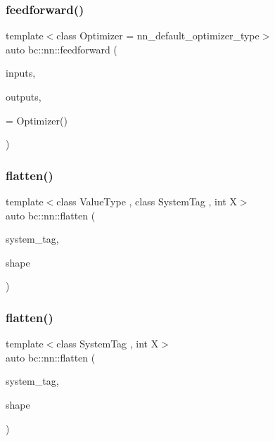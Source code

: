 \mbox{\label{namespacebc_1_1nn_ab37956d86d4c9663196041a734e4383e}} 
\subsubsection{\texorpdfstring{feedforward()}{feedforward()}\hspace{0.1cm}{\footnotesize\ttfamily [2/2]}}
{\footnotesize\ttfamily template$<$class Optimizer  = nn\+\_\+default\+\_\+optimizer\+\_\+type$>$ \\
auto bc\+::nn\+::feedforward (\begin{DoxyParamCaption}\item[{int}]{inputs,  }\item[{int}]{outputs,  }\item[{Optimizer}]{ = {\ttfamily Optimizer()} }\end{DoxyParamCaption})}

\mbox{\label{namespacebc_1_1nn_ad3ccbb13b94637fc40bcd46d2cd5b1e4}} 
\subsubsection{\texorpdfstring{flatten()}{flatten()}\hspace{0.1cm}{\footnotesize\ttfamily [1/3]}}
{\footnotesize\ttfamily template$<$class Value\+Type , class System\+Tag , int X$>$ \\
auto bc\+::nn\+::flatten (\begin{DoxyParamCaption}\item[{System\+Tag}]{system\+\_\+tag,  }\item[{\hyperlink{structbc_1_1Dim}{Dim}$<$ X $>$}]{shape }\end{DoxyParamCaption})}

\mbox{\label{namespacebc_1_1nn_afcf9752c3b29c98ef665dd710b18c7fd}} 
\subsubsection{\texorpdfstring{flatten()}{flatten()}\hspace{0.1cm}{\footnotesize\ttfamily [2/3]}}
{\footnotesize\ttfamily template$<$class System\+Tag , int X$>$ \\
auto bc\+::nn\+::flatten (\begin{DoxyParamCaption}\item[{System\+Tag}]{system\+\_\+tag,  }\item[{\hyperlink{structbc_1_1Dim}{Dim}$<$ X $>$}]{shape }\end{DoxyParamCaption})}


